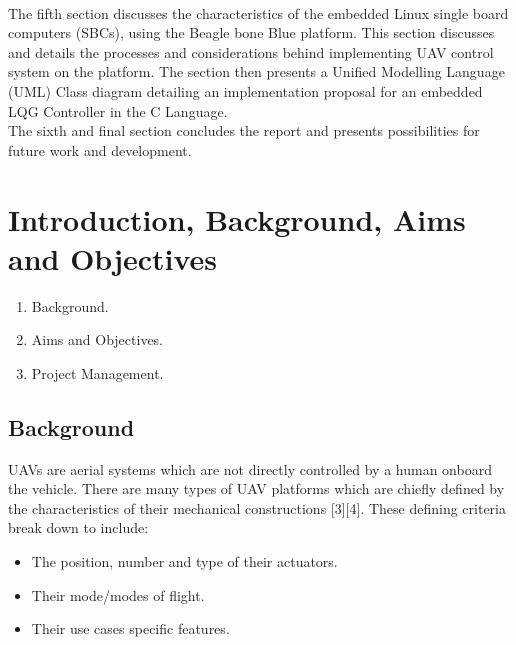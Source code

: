 \documentclass[12pt,a4paper,twoside]{report}
\begin{document}
		\\ 
		The fifth section discusses the characteristics of the embedded Linux single board computers (SBCs), using the Beagle bone Blue platform. This section discusses and details the processes and considerations behind implementing UAV control system on the platform. The section then presents a Unified Modelling Language (UML) Class diagram detailing an implementation proposal for an embedded LQG Controller in the C Language.
		\\
		The sixth and final section concludes the report and presents possibilities for future work and development.
		
	\newpage
	
	\section{Introduction, Background, Aims and Objectives }
		
		\begin{enumerate}
			\item
				Background.
			\item 
				Aims and Objectives. 
			\item 
				Project Management.
		\end{enumerate}
	
	 	\newpage
	 	
		\subsection{Background}
		
			UAVs are aerial systems which are not directly controlled by a human onboard the vehicle. There are many types of UAV platforms which are chiefly defined by the characteristics of their mechanical constructions [3][4]. These defining criteria break down to include:
			
			\begin{itemize}
				\item
					The position, number and type of their actuators.
				\item 
					Their mode/modes of flight. 
				\item 
					Their use cases specific features.
			\end{itemize}
		
\end{document}
